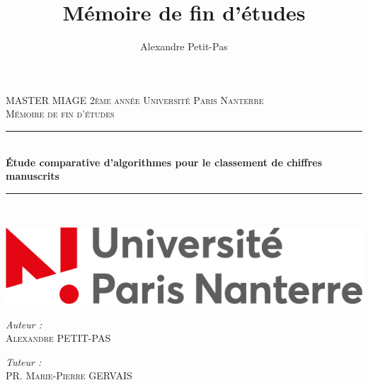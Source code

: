 \documentclass[12pt, twoside, openright]{report}
\author{Alexandre Petit-Pas}
\title{Mémoire de fin d'études}
\begin{document}
%

\setlength{\parindent}{0cm}
\setlength{\parskip}{1ex plus 0.5ex minus 0.2ex}
\newcommand{\hsp}{\hspace{20pt}}
\newcommand{\HRule}{\rule{\linewidth}{0.5mm}}

\begin{titlepage}
  \begin{sffamily}
  \begin{center}

    \textsc{\LARGE MASTER MIAGE 2ème année \linebreak Université Paris Nanterre}\\[2cm]

    \textsc{\Large Mémoire de fin d'études}\\[1.5cm]

    \HRule \\[0.4cm]
    { \huge \bfseries Étude comparative d'algorithmes pour le classement de chiffres manuscrits\\[0.4cm] }

    \HRule \\[2cm]
    \vfill
    \begin{center}
    \includegraphics[scale=0.40]{img/logo_nanterre.jpg}
    \end{center}
    \hspace{2cm}
    
    \vfill
  \begin{minipage}{0.3\textwidth}
      \begin{flushleft} \large
        \emph{Auteur :}\\ \textsc{Alexandre PETIT-PAS}\\
      \end{flushleft}
    \end{minipage}
    \begin{minipage}{0.4\textwidth}
      \begin{flushright} \large
        \emph{Tuteur :}\\ \textsc{PR. Marie-Pierre GERVAIS}\\
      \end{flushright}
    \end{minipage}
    \vfill
  \end{center}
  \end{sffamily}
\end{titlepage}
\end{document}
